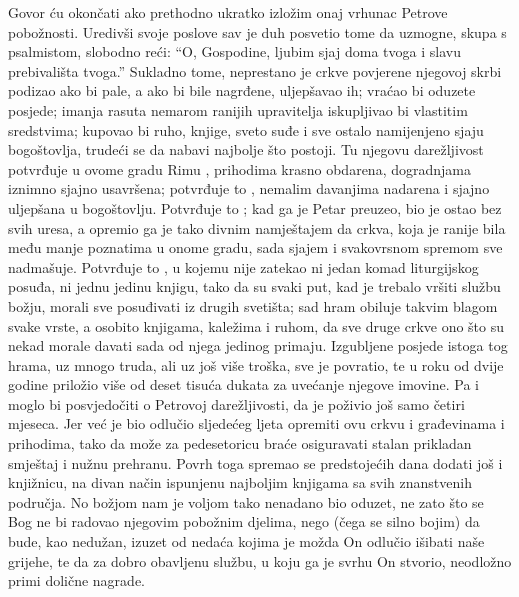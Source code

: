 \documentclass[a5paper,twoside]{article}
\begin{document}
\pend
\pstart
Govor ću okončati ako prethodno ukratko izložim onaj vrhunac Petrove pobožnosti. Uredivši svoje poslove sav je duh posvetio tome da uzmogne, skupa s psalmistom, slobodno reći: ``O, Gospodine, ljubim sjaj doma tvoga i slavu prebivališta tvoga.'' Sukladno tome, neprestano je crkve povjerene njegovoj skrbi podizao ako bi pale, a ako bi bile nagrđene, uljepšavao ih; vraćao bi oduzete posjede; imanja rasuta nemarom ranijih upravitelja iskupljivao bi vlastitim sredstvima; kupovao bi ruho, knjige, sveto suđe i sve ostalo namijenjeno sjaju bogoštovlja, trudeći se da nabavi najbolje što postoji.  Tu njegovu darežljivost potvrđuje u ovome gradu Rimu , prihodima krasno obdarena, dogradnjama iznimno sjajno usavršena; potvrđuje to , nemalim davanjima nadarena i sjajno uljepšana u bogoštovlju. Potvrđuje to ; kad ga je Petar preuzeo, bio je ostao bez svih uresa, a opremio ga je tako divnim namještajem da crkva, koja je ranije bila među manje poznatima u onome gradu, sada sjajem i svakovrsnom spremom sve nadmašuje.  Potvrđuje to , u kojemu nije zatekao ni jedan komad liturgijskog posuđa, ni jednu jedinu knjigu, tako da su svaki put, kad je trebalo vršiti službu božju, morali sve posuđivati iz drugih svetišta; sad hram obiluje takvim blagom svake vrste, a osobito knjigama, kaležima i ruhom, da sve druge crkve ono što su nekad morale davati sada od njega jedinog primaju.  Izgubljene posjede istoga tog hrama, uz mnogo truda, ali uz još više troška, sve je povratio, te u roku od dvije godine priložio više od deset tisuća dukata za uvećanje njegove imovine.  Pa i  moglo bi posvjedočiti o Petrovoj darežljivosti, da je poživio još samo četiri mjeseca. Jer već je bio odlučio sljedećeg ljeta opremiti ovu crkvu i građevinama i prihodima, tako da može za pedesetoricu braće osiguravati stalan prikladan smještaj i nužnu prehranu.  Povrh toga spremao se predstojećih dana dodati još i knjižnicu, na divan način ispunjenu najboljim knjigama sa svih znanstvenih područja.  No božjom nam je voljom tako nenadano bio oduzet, ne zato što se Bog ne bi radovao njegovim pobožnim djelima, nego (čega se silno bojim) da bude, kao nedužan, izuzet od nedaća kojima je možda On odlučio išibati naše grijehe, te da za dobro obavljenu službu, u koju ga je svrhu On stvorio, neodložno primi dolične nagrade.  
\end{document}

